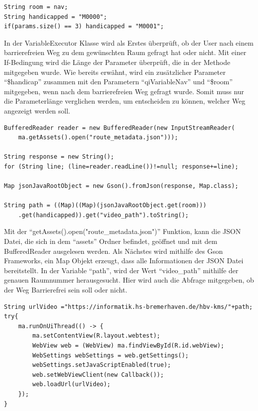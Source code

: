 \begin{lstlisting}
String room = nav;
String handicapped = "M0000";
if(params.size() == 3) handicapped = "M0001";
\end{lstlisting}


In der VariableExecutor Klasse wird als Erstes überprüft, ob der User nach einem barrierefreien Weg zu dem gewünschten Raum 
gefragt hat oder nicht. Mit einer If-Bedingung wird die Länge der Parameter überprüft, die in der Methode mitgegeben wurde. 
Wie bereits erwähnt, wird ein zusätzlicher Parameter ``\$handicap'' zusammen mit den Parametern ``qiVariableNav'' 
und ``\$room'' mitgegeben, wenn nach dem barrierefreien Weg gefragt wurde. Somit muss nur die Parameterlänge verglichen 
werden, um entscheiden zu können, welcher Weg angezeigt werden soll.

\begin{lstlisting}
BufferedReader reader = new BufferedReader(new InputStreamReader(
    ma.getAssets().open("route_metadata.json")));

String response = new String();
for (String line; (line=reader.readLine())!=null; response+=line);

Map jsonJavaRootObject = new Gson().fromJson(response, Map.class);

String path = ((Map)((Map)(jsonJavaRootObject.get(room)))
    .get(handicapped)).get("video_path").toString();
\end{lstlisting}

Mit der ``getAssets().open("route\_metadata.json")'' Funktion, kann die JSON Datei, die sich in dem ``assets'' 
Ordner befindet, geöffnet und mit dem BufferedReader ausgelesen werden. Als Nächstes wird mithilfe des Gson Frameworks, 
ein Map Objekt erzeugt, dass alle Informationen der JSON Datei bereitstellt. In der Variable ``path'', wird der Wert 
``video\_path'' mithilfe der genauen Raumnummer herausgesucht. Hier wird auch die Abfrage mitgegeben, ob der Weg 
Barrierefrei sein soll oder nicht.


\begin{lstlisting}
String urlVideo ="https://informatik.hs-bremerhaven.de/hbv-kms/"+path;
try{
    ma.runOnUiThread(() -> {
        ma.setContentView(R.layout.webtest);
        WebView web = (WebView) ma.findViewById(R.id.webView);
        WebSettings webSettings = web.getSettings();
        webSettings.setJavaScriptEnabled(true);
        web.setWebViewClient(new Callback());
        web.loadUrl(urlVideo);
    });
}
\end{lstlisting}

